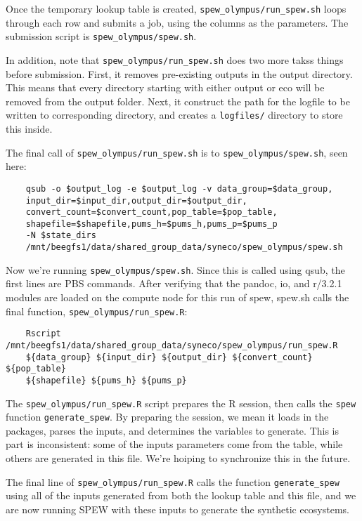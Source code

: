 \documentclass{article}
\begin{document}
Once the temporary lookup table is created, \verb|spew_olympus/run_spew.sh| loops through each row and submits a job, using the columns as the parameters. The submission script is \verb|spew_olympus/spew.sh|. 

In addition, note that \verb|spew_olympus/run_spew.sh| does two more takss things before submission. First, it removes pre-existing outputs in the output directory. This means that every directory starting with either output or eco will be removed from the output folder. Next, it construct the path for the logfile to be written to corresponding directory, and creates a \verb|logfiles/| directory to store this inside.

The final call of \verb|spew_olympus/run_spew.sh| is to \verb|spew_olympus/spew.sh|, seen here:

\begin{verbatim}
	qsub -o $output_log -e $output_log -v data_group=$data_group,
	input_dir=$input_dir,output_dir=$output_dir,
	convert_count=$convert_count,pop_table=$pop_table,
	shapefile=$shapefile,pums_h=$pums_h,pums_p=$pums_p 
	-N $state_dirs 
	/mnt/beegfs1/data/shared_group_data/syneco/spew_olympus/spew.sh
\end{verbatim}	

Now we're running \verb|spew_olympus/spew.sh|. Since this is called using qsub, the first lines are PBS commands. After verifying that the pandoc, io, and r/3.2.1 modules are loaded on the compute node for this run of spew, spew.sh calls the final function, \verb|spew_olympus/run_spew.R|:

\begin{verbatim}
	Rscript /mnt/beegfs1/data/shared_group_data/syneco/spew_olympus/run_spew.R 
	${data_group} ${input_dir} ${output_dir} ${convert_count} ${pop_table} 
	${shapefile} ${pums_h} ${pums_p}
\end{verbatim}	

The \verb|spew_olympus/run_spew.R| script prepares the R session, then calls the \verb|spew| function \verb|generate_spew|. By preparing the session, we mean it loads in the packages, parses the inputs, and determines the variables to generate. This is part is inconsistent: some of the inputs parameters come from the table, while others are generated in this file. We're hoiping to synchronize this in the future. 

The final line of \verb|spew_olympus/run_spew.R| calls the function \verb|generate_spew| using all of the inputs generated from both the lookup table and this file, and we are now running SPEW with these inputs to generate the synthetic ecosystems. 
\end{document}
